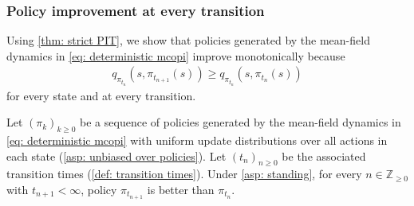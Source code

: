 \subsubsection{Policy improvement at every transition}

Using \autoref{thm: strict PIT},
we show that 
policies generated by the mean-field dynamics in \eqref{eq: deterministic mcopi} improve monotonically
because
\begin{align}
\label{eq: strict improvement theorem}
q_{\pi_{t_n}}(s,\pi_{t_{n+1}}(s)) \ge q_{\pi_{t_n}}(s,\pi_{t_n}(s))
\end{align}
for every state and at every transition.

\begin{proposition}
\label{thm: improving policies}
Let \((\pi_k)_{k\ge 0}\) be a sequence of policies generated by the mean-field dynamics in \eqref{eq: deterministic mcopi}
with uniform update distributions over all actions in each state (\autoref{asp: unbiased over policies}).
Let \((t_n)_{n\ge 0}\) be the associated transition times (\autoref{def: transition times}).
Under \autoref{asp: standing},
for every \(n \in \mathbb Z_{\ge 0}\) with \(t_{n+1}<\infty\), policy
\(\pi_{t_{n+1}}\) is better than \(\pi_{t_n}\).
\end{proposition}
% 
